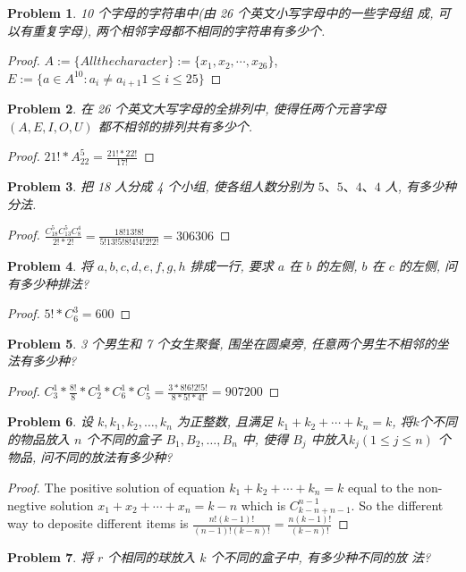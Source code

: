 \documentclass{ctexart}
\newtheorem{problem}{\textbf{Problem}}
\renewcommand{\(}{\left(}
\renewcommand{\)}{\right)}
\begin{document}
\begin{problem}
10 个字母的字符串中(由 26 个英文小写字母中的一些字母组 成, 可以有重复字母), 两个相邻字母都不相同的字符串有多少个.
\end{problem}
\begin{proof}
$A:=\{All the character\}:=\{x_1,x_2,\cdots,x_{26}\}$, $E:=\{a\in A^{10}:a_i\neq a_{i+1}1\leq i\leq25\}$
\end{proof}
\begin{problem}
在 26 个英文大写字母的全排列中, 使得任两个元音字母 $(A, E, I, O, U)$ 都不相邻的排列共有多少个.
\end{problem}
\begin{proof}
$21!*A_{22}^{5}=\frac{21!*22!}{17!}$
\end{proof}
\begin{problem}
把 18 人分成 4 个小组, 使各组人数分别为 $5 、 5 、 4 、 4$ 人, 有多少种分法.
\end{problem}
\begin{proof}
$\frac{C_{18}^{5}C_{13}^{5}C_{8}^{4}}{2!*2!}=\frac{18!13!8!}{5!13!5!8!4!4!2!2!}=306306$
\end{proof}
\begin{problem}
将 $a, b, c, d, e, f, g, h$ 排成一行, 要求 $a$ 在 $b$ 的左侧, $b$ 在 $c$ 的左侧, 问有多少种排法?
\end{problem}
\begin{proof}
$5!*C_{6}^{3}=600$
\end{proof}
\begin{problem}
3 个男生和 7 个女生聚餐, 围坐在圆桌旁, 任意两个男生不相邻的坐法有多少种?
\end{problem}
\begin{proof}
$C_{3}^{1}*\frac{8!}{8}*C_{2}^{1}*C_{6}^{1}*C_{5}^{1}=\frac{3*8!6!2!5!}{8*5!*4!}=907200$
\end{proof}
\begin{problem}
设 $k, k_1, k_2, \ldots, k_n$ 为正整数, 且满足 $k_1+k_2+\cdots+k_n=k$, 将$k$个不同的物品放入 $n$ 个不同的盒子 $B_1, B_2, \ldots, B_n$ 中, 使得 $B_j$ 中放入$k_j(1 \leq j \leq n)$ 个物品, 问不同的放法有多少种?
\end{problem}
\begin{proof}
The positive solution of equation $k_1+k_2+\cdots+k_n=k$ equal to the non-negtive solution $x_1+x_2+\cdots+x_n=k-n$ which is $C_{k-n+n-1}^{n-1}$. So the different way to deposite different items is $\frac{n!(k-1)!}{(n-1)!(k-n)!}=\frac{n(k-1)!}{(k-n)!}$
\end{proof}
\begin{problem}
将 $r$ 个相同的球放入 $k$ 个不同的盒子中, 有多少种不同的放 法?
\end{problem}
\end{document}
